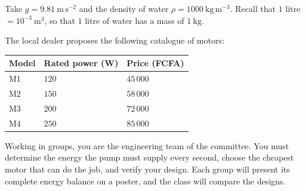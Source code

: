 \documentclass[11pt]{article}
\newcommand{\cle}[1]{{\popxbold\color{popdark}#1}}
\newcounter{popsec}
\newcounter{popsub}
\newcommand{\courssub}[1]{%
  \stepcounter{popsub}%
  \par\vspace{9pt}\noindent{\popxbold\fontsize{11.5}{13}\selectfont\color{popink}{\color{poporange}\thepopsec.\thepopsub}\hspace{6pt}#1}\par\nopagebreak\vspace{4pt}
}
\begin{document}
Take $g = 9.81\ \mathrm{m\,s^{-2}}$ and the density of water $\rho = 1000\ \mathrm{kg\,m^{-3}}$. Recall that $1$ litre $= 10^{-3}\ \mathrm{m^{3}}$, so that $1$ litre of water has a mass of $1\ \mathrm{kg}$.

The local dealer proposes the following catalogue of motors:

\begin{center}
\begin{tabularx}{\linewidth}{|l|X|X|}
\hline
\rowcolor{popblueL} \textbf{Model} & \textbf{Rated power (W)} & \textbf{Price (FCFA)} \\
\hline
M1 & $120$ & $45\,000$ \\
\hline
M2 & $150$ & $58\,000$ \\
\hline
M3 & $200$ & $72\,000$ \\
\hline
M4 & $250$ & $85\,000$ \\
\hline
\end{tabularx}
\end{center}

Working in groups, you are the engineering team of the committee. You must determine the energy the pump must supply every second, choose the cheapest motor that can do the job, and verify your design. Each group will present its complete \cle{energy balance} on a poster, and the class will compare the designs.

\courssub{Tasks}
\end{document}
